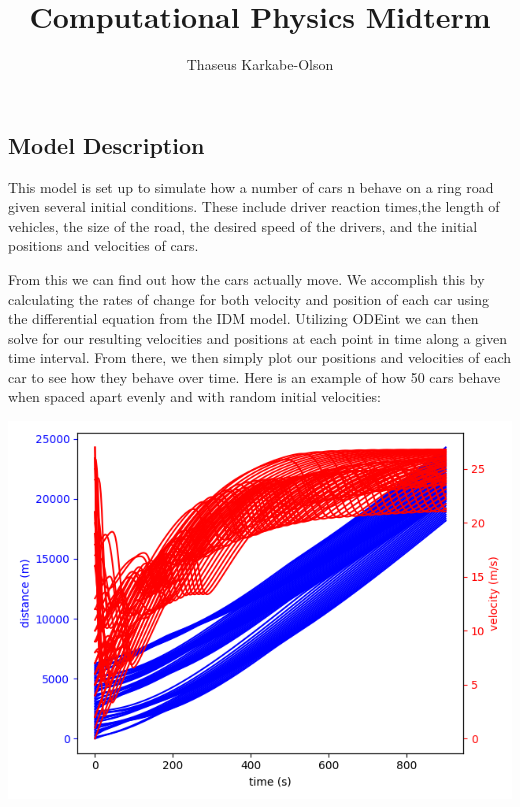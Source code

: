 \documentclass[11pt]{article}
\title{Computational Physics Midterm}
\author{Thaseus Karkabe-Olson}
\date{}
\begin{document}
	
	
	\maketitle
	
	\begin{multicols}{2}

	\begin{center}

	\section*{Model Description}

	\end{center}

		\indent This model is set up to simulate how a number of cars n behave on a ring road given several initial conditions. These include driver reaction times,the length of vehicles, the size of the road,
		the desired speed of the drivers, and the initial positions and velocities of cars.

		\indent From this we can find out how the cars actually move. We accomplish this by calculating the rates of change for both velocity and position of each car using the differential equation
		from the IDM model. Utilizing ODEint we can then solve for our resulting velocities and positions at each point in time along a given time interval. From there, we then simply plot our positions and
		velocities of each car to see how they behave over time. Here is an example of how 50 cars behave when spaced apart evenly and with random initial velocities:


		\includegraphics[scale = 0.5]{Figure_1.png}


\end{multicols}
\end{document}
